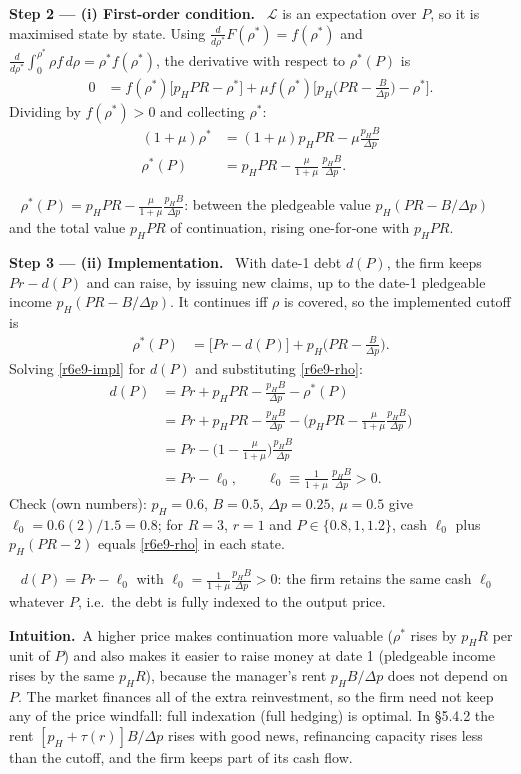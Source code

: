 \documentclass[11pt,a4paper]{article}
\newcommand{\step}[2]{\par\medskip\noindent\textbf{Step #1 --- #2.}~}
\newcommand{\intuition}{\par\medskip\noindent\textbf{Intuition.}~}
\newcommand{\answer}[1]{\par\smallskip\noindent\fbox{\textbf{Answer #1.}}~}
\begin{document}
\step{2}{(i) First-order condition} $\mathcal L$ is an expectation over $P$, so it is maximised state by state. Using $\frac{d}{d\rho^*}F(\rho^*)=f(\rho^*)$ and $\frac{d}{d\rho^*}\int_0^{\rho^*}\rho f\,d\rho=\rho^*f(\rho^*)$, the derivative with respect to $\rho^*(P)$ is
\begin{align}
  0 &= f(\rho^*)\big[p_HPR-\rho^*\big]+\mu f(\rho^*)\Big[p_H\Big(PR-\frac{B}{\Delta p}\Big)-\rho^*\Big]. \nonumber
\end{align}
Dividing by $f(\rho^*)>0$ and collecting $\rho^*$:
\begin{align}
  (1+\mu)\rho^* &= (1+\mu)p_HPR-\mu\frac{p_HB}{\Delta p} \nonumber\\
  \rho^*(P) &= p_HPR-\frac{\mu}{1+\mu}\,\frac{p_HB}{\Delta p}. \label{r6e9-rho}
\end{align}
\answer{(i)} $\rho^*(P)=p_HPR-\frac{\mu}{1+\mu}\frac{p_HB}{\Delta p}$: between the pledgeable value $p_H(PR-B/\Delta p)$ and the total value $p_HPR$ of continuation, rising one-for-one with $p_HPR$.

\step{3}{(ii) Implementation} With date-1 debt $d(P)$, the firm keeps $Pr-d(P)$ and can raise, by issuing new claims, up to the date-1 pledgeable income $p_H(PR-B/\Delta p)$. It continues iff $\rho$ is covered, so the implemented cutoff is
\begin{align}
  \rho^*(P) &= \big[Pr-d(P)\big]+p_H\Big(PR-\frac{B}{\Delta p}\Big). \label{r6e9-impl}
\end{align}
Solving \eqref{r6e9-impl} for $d(P)$ and substituting \eqref{r6e9-rho}:
\begin{align}
  d(P) &= Pr+p_HPR-\frac{p_HB}{\Delta p}-\rho^*(P) \nonumber\\
       &= Pr+p_HPR-\frac{p_HB}{\Delta p}-\Big(p_HPR-\frac{\mu}{1+\mu}\frac{p_HB}{\Delta p}\Big) \nonumber\\
       &= Pr-\Big(1-\frac{\mu}{1+\mu}\Big)\frac{p_HB}{\Delta p} \nonumber\\
       &= Pr-\ell_0,\qquad \ell_0\equiv\frac{1}{1+\mu}\,\frac{p_HB}{\Delta p}>0. \label{r6e9-d}
\end{align}
Check (own numbers): $p_H=0.6$, $B=0.5$, $\Delta p=0.25$, $\mu=0.5$ give $\ell_0=0.6(2)/1.5=0.8$; for $R=3$, $r=1$ and $P\in\{0.8,1,1.2\}$, cash $\ell_0$ plus $p_H(PR-2)$ equals \eqref{r6e9-rho} in each state.
\answer{(ii)} $d(P)=Pr-\ell_0$ with $\ell_0=\frac{1}{1+\mu}\frac{p_HB}{\Delta p}>0$: the firm retains the same cash $\ell_0$ whatever $P$, i.e.\ the debt is fully indexed to the output price.

\intuition A higher price makes continuation more valuable ($\rho^*$ rises by $p_HR$ per unit of $P$) and also makes it easier to raise money at date 1 (pledgeable income rises by the same $p_HR$), because the manager's rent $p_HB/\Delta p$ does not depend on $P$. The market finances all of the extra reinvestment, so the firm need not keep any of the price windfall: full indexation (full hedging) is optimal. In \S 5.4.2 the rent $[p_H+\tau(r)]B/\Delta p$ rises with good news, refinancing capacity rises less than the cutoff, and the firm keeps part of its cash flow.
\end{document}

